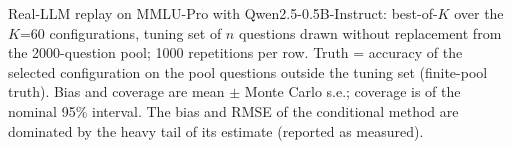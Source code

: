 Real-LLM replay on MMLU-Pro with Qwen2.5-0.5B-Instruct: best-of-$K$ over the $K$=60 configurations, tuning set of $n$ questions drawn without replacement from the 2000-question pool; 1000 repetitions per row. Truth = accuracy of the selected configuration on the pool questions outside the tuning set (finite-pool truth). Bias and coverage are mean $\pm$ Monte Carlo s.e.; coverage is of the nominal 95\% interval. The bias and RMSE of the conditional method are dominated by the heavy tail of its estimate (reported as measured).
